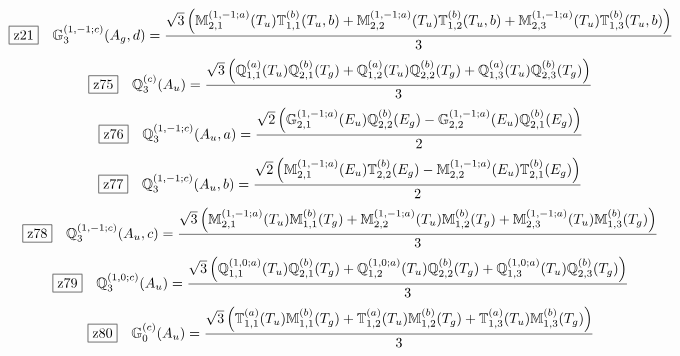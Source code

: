 \documentclass[fleqn,10pt,landscape]{jsarticle}
\begin{document}
\begin{dmath*}
\hspace*{3mm}\fbox{z21}\quad \mathbb{G}_{3}^{(1,-1;c)}(A_{g},d)=\frac{\sqrt{3} \left(\mathbb{M}_{2,1}^{(1,-1;a)}(T_{u}) \mathbb{T}_{1,1}^{(b)}(T_{u},b) + \mathbb{M}_{2,2}^{(1,-1;a)}(T_{u}) \mathbb{T}_{1,2}^{(b)}(T_{u},b) + \mathbb{M}_{2,3}^{(1,-1;a)}(T_{u}) \mathbb{T}_{1,3}^{(b)}(T_{u},b)\right)}{3}
\end{dmath*}
\begin{dmath*}
\hspace*{3mm}\fbox{z75}\quad \mathbb{Q}_{3}^{(c)}(A_{u})=\frac{\sqrt{3} \left(\mathbb{Q}_{1,1}^{(a)}(T_{u}) \mathbb{Q}_{2,1}^{(b)}(T_{g}) + \mathbb{Q}_{1,2}^{(a)}(T_{u}) \mathbb{Q}_{2,2}^{(b)}(T_{g}) + \mathbb{Q}_{1,3}^{(a)}(T_{u}) \mathbb{Q}_{2,3}^{(b)}(T_{g})\right)}{3}
\end{dmath*}
\begin{dmath*}
\hspace*{3mm}\fbox{z76}\quad \mathbb{Q}_{3}^{(1,-1;c)}(A_{u},a)=\frac{\sqrt{2} \left(\mathbb{G}_{2,1}^{(1,-1;a)}(E_{u}) \mathbb{Q}_{2,2}^{(b)}(E_{g}) - \mathbb{G}_{2,2}^{(1,-1;a)}(E_{u}) \mathbb{Q}_{2,1}^{(b)}(E_{g})\right)}{2}
\end{dmath*}
\begin{dmath*}
\hspace*{3mm}\fbox{z77}\quad \mathbb{Q}_{3}^{(1,-1;c)}(A_{u},b)=\frac{\sqrt{2} \left(\mathbb{M}_{2,1}^{(1,-1;a)}(E_{u}) \mathbb{T}_{2,2}^{(b)}(E_{g}) - \mathbb{M}_{2,2}^{(1,-1;a)}(E_{u}) \mathbb{T}_{2,1}^{(b)}(E_{g})\right)}{2}
\end{dmath*}
\begin{dmath*}
\hspace*{3mm}\fbox{z78}\quad \mathbb{Q}_{3}^{(1,-1;c)}(A_{u},c)=\frac{\sqrt{3} \left(\mathbb{M}_{2,1}^{(1,-1;a)}(T_{u}) \mathbb{M}_{1,1}^{(b)}(T_{g}) + \mathbb{M}_{2,2}^{(1,-1;a)}(T_{u}) \mathbb{M}_{1,2}^{(b)}(T_{g}) + \mathbb{M}_{2,3}^{(1,-1;a)}(T_{u}) \mathbb{M}_{1,3}^{(b)}(T_{g})\right)}{3}
\end{dmath*}
\begin{dmath*}
\hspace*{3mm}\fbox{z79}\quad \mathbb{Q}_{3}^{(1,0;c)}(A_{u})=\frac{\sqrt{3} \left(\mathbb{Q}_{1,1}^{(1,0;a)}(T_{u}) \mathbb{Q}_{2,1}^{(b)}(T_{g}) + \mathbb{Q}_{1,2}^{(1,0;a)}(T_{u}) \mathbb{Q}_{2,2}^{(b)}(T_{g}) + \mathbb{Q}_{1,3}^{(1,0;a)}(T_{u}) \mathbb{Q}_{2,3}^{(b)}(T_{g})\right)}{3}
\end{dmath*}
\begin{dmath*}
\hspace*{3mm}\fbox{z80}\quad \mathbb{G}_{0}^{(c)}(A_{u})=\frac{\sqrt{3} \left(\mathbb{T}_{1,1}^{(a)}(T_{u}) \mathbb{M}_{1,1}^{(b)}(T_{g}) + \mathbb{T}_{1,2}^{(a)}(T_{u}) \mathbb{M}_{1,2}^{(b)}(T_{g}) + \mathbb{T}_{1,3}^{(a)}(T_{u}) \mathbb{M}_{1,3}^{(b)}(T_{g})\right)}{3}
\end{dmath*}
\end{document}
